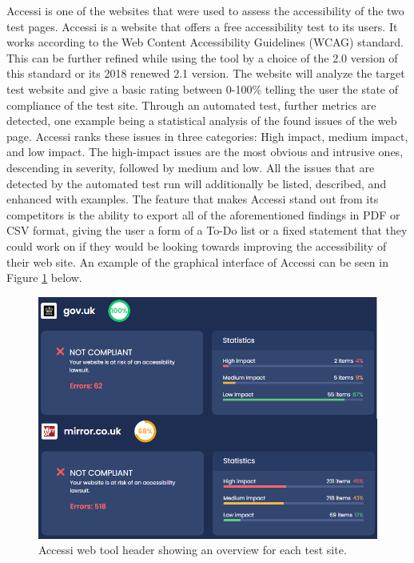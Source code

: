 Accessi \parencite{Accessi} is one of the websites that were used to assess the accessibility of the two test pages. Accessi is a website that offers a free accessibility test to its users. It works according to the Web Content Accessibility Guidelines (WCAG) standard. This can be further refined while using the tool by a choice of the 2.0 version of this standard or its 2018 renewed 2.1 version.  
The website will analyze the target test website and give a basic rating between 0-100\% telling the user the state of compliance of the test site. Through an automated test, further metrics are detected, one example being a statistical analysis of the found issues of the web page. Accessi ranks these issues in three categories: High impact, medium impact, and low impact. The high-impact issues are the most obvious and intrusive ones, descending in severity, followed by medium and low. All the issues that are detected by the automated test run will additionally be listed, described, and enhanced with examples. The feature that makes Accessi stand out from its competitors is the ability to export all of the aforementioned findings in PDF or CSV format, giving the user a form of a To-Do list or a fixed statement that they could work on if they would be looking towards improving the accessibility of their web site. An example of the graphical interface of Accessi can be seen in Figure \ref{fig:accessi} below.

\begin{figure}[h!]
    \centering
    \includegraphics[keepaspectratio,width=\linewidth,height=\halfh]
    {images/accessi.png}
    
    \caption[Accessi Overview]
    {%
    Accessi web tool header showing an overview for each test site.
    }
    \label{fig:accessi}
\end{figure}

